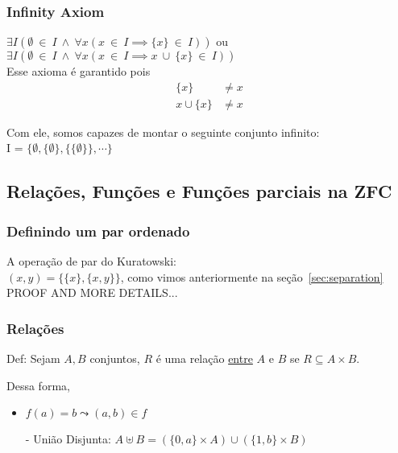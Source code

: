 \documentclass[12pt, a4paper]{article}
\begin{document}
\subsubsection{Infinity Axiom}
\label{sec:infinity}
$\exists I (\emptyset ~\in~ I ~\land~ \forall x (x ~\in~ I \implies \{x\} ~\in~ I ))$ ou\\
$\exists I (\emptyset ~\in~ I ~\land~ \forall x (x ~\in~ I \implies x ~\cup~ \{x\} ~\in~ I ))$\\

Esse axioma é garantido pois\\
\begin{align*}
\{x\} &\ne x \\
x \cup \{x\} &\ne x
\end{align*}

Com ele, somos capazes de montar o seguinte conjunto infinito:\\
I = $\{ \emptyset, \{\emptyset\}, \{\{\emptyset\}\}, \cdots \}$

\subsection{Relações, Funções e Funções parciais na ZFC}
\subsubsection{Definindo um par ordenado}
A operação de par do Kuratowski:\\
$ (x, y) = \{ \{x\}, \{x, y\}\} $, como vimos anteriormente na seção~\ref{sec:separation}\\

PROOF AND MORE DETAILS...

\subsubsection{Relações}

Def: Sejam $A,B$ conjuntos, $R$ é uma relação \underline{entre} $A$ e $B$ se $R \subseteq A \times B$.

Dessa forma,
\begin{itemize}
\item $f(a) = b \leadsto (a,b) \in f$
\end{itemize}

\begin{itemize}
\item[-] União Disjunta: $A \uplus B = (\{0,a\} \times A) \cup (\{1,b\} \times B)$
\end{itemize}
\end{document}
